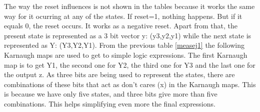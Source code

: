 The way the reset influences is not shown in the tables because it works the same way for it ocurring at any of the states. If reset=1, nothing happens. But if it equals 0, the reset occurs. It works as a negative reset. Apart from that, the present state is represented as a 3 bit vector y: (y3,y2,y1) while the next state is represented as Y: (Y3,Y2,Y1). From the previous table \ref {measej1} the following Karnaugh maps are used to get to simple logic expressions. The first Karnaugh map is to get Y1, the second one for Y2, the third one for Y3 and the last one for the output z. As three bits are being used to represent the states, there are combinations of these bits that act as don't cares (x) in the Karnaugh maps. This is because we have only five states, and three bits give more than five combinations. This helps simplifying even more the final expressions.

\begin{center} 
        \begin{Karnaugh}
        \end{Karnaugh}
    \end{center}



\begin{center}
        \begin{Karnaugh}
        \end{Karnaugh}
    \end{center}
  
  
\begin{center}
        \begin{Karnaugh}
        \end{Karnaugh}
    \end{center}
    
